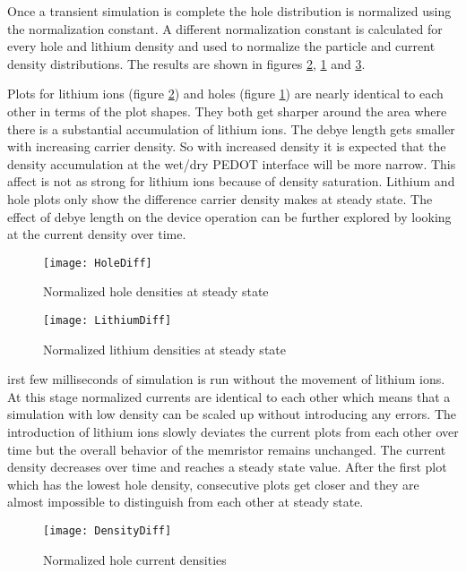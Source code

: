 \begin{doublespace}
Once a transient simulation is complete the hole distribution is normalized using the normalization constant. A different normalization constant is calculated for every hole and lithium density and used to normalize the particle and current density distributions. The results are shown in figures \ref{LithiumDiff}, \ref{HoleDiff} and \ref{DensityDiff}. 
 
Plots for lithium ions (figure \ref{LithiumDiff}) and holes (figure \ref{HoleDiff}) are nearly identical to each other in terms of the plot shapes. They both get sharper around the area where there is a substantial accumulation of lithium ions. The debye length gets smaller with increasing carrier density. So with increased density it is expected that the density accumulation at the wet/dry PEDOT interface will be more narrow. This affect is not as strong for lithium ions because of density saturation. Lithium and hole plots only show the difference carrier density makes at steady state. The effect of debye length on the device operation can be further explored by looking at the current density over time.   

\begin{figure}[!htp]
\centering
\texttt{[image: HoleDiff]}
\caption{Normalized hole densities at steady state} 
\label{HoleDiff}
\end{figure}

\begin{figure}[!htp]
\centering
\texttt{[image: LithiumDiff]}
\caption{Normalized lithium densities at steady state} 
\label{LithiumDiff}
\end{figure}

irst few milliseconds of  simulation is run without  the movement of lithium ions. At this stage normalized currents are identical to each other which means that a simulation with low density can be scaled up without introducing any errors. The introduction of lithium ions slowly deviates the current plots from each other over time but the overall behavior of the memristor remains unchanged. The current density decreases over time and reaches a steady state value. After the first plot which has the lowest hole density, consecutive plots get closer and they are almost impossible to distinguish from each other at steady state.

\begin{figure}[!htp]
\centering
\texttt{[image: DensityDiff]}
\caption{Normalized hole current densities} 
\label{DensityDiff}
\end{figure}


\end{doublespace}
